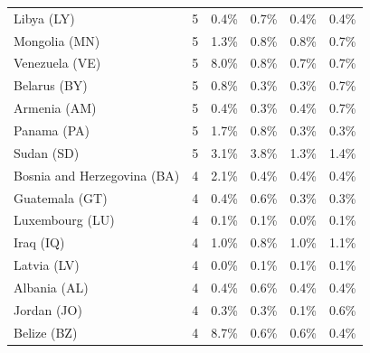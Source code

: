 {\begin{table}[ht]
{\begin{tabular}{lccccc}
Libya (LY)            &     5  & \cellcolor{green0} 0.4\% & 0.7\% & \cellcolor{green0} 0.4\% & \cellcolor{green0} 0.4\% \\  %
Mongolia (MN)         &     5  & \cellcolor{red0} 1.3\% & 0.8\% & 0.8\% & \cellcolor{green0} 0.7\% \\  %
Venezuela (VE)        &     5  & \cellcolor{red5}  8.0\% & \cellcolor{green0} 0.8\% & \cellcolor{green0} 0.7\% & \cellcolor{green0} 0.7\% \\  %
Belarus (BY)          &     5  & 0.8\% & \cellcolor{green1} 0.3\% & \cellcolor{green1} 0.3\% & 0.7\% \\  %
Armenia (AM)          &     5  & \cellcolor{green1} 0.4\% & \cellcolor{green2} 0.3\% & \cellcolor{green1} 0.4\% & 0.7\% \\  %
Panama (PA)           &     5  & 1.7\% & \cellcolor{green0} 0.8\% & \cellcolor{green0} 0.3\% & \cellcolor{green0} 0.3\% \\  %
Sudan (SD)            &     5  & 3.1\% & 3.8\% & \cellcolor{green1} 1.3\% & \cellcolor{green1} 1.4\% \\  %
Bosnia and Herzegovina (BA)  &     4  & \cellcolor{red1} 2.1\% & \cellcolor{green0} 0.4\% & \cellcolor{green0} 0.4\% & \cellcolor{green0} 0.4\% \\  %
Guatemala (GT)        &     4  & 0.4\% & \cellcolor{red0} 0.6\% & \cellcolor{green1} 0.3\% & \cellcolor{green1} 0.3\% \\  %
Luxembourg (LU)       &     4  & 0.1\% & 0.1\% & \cellcolor{green0} 0.0\% & 0.1\% \\  %
Iraq (IQ)             &     4  & \cellcolor{green0} 1.0\% & \cellcolor{green0} 0.8\% & \cellcolor{green0} 1.0\% & \cellcolor{green0} 1.1\% \\  %
Latvia (LV)           &     4  & \cellcolor{green2} 0.0\% & 0.1\% & 0.1\% & 0.1\% \\  %
Albania (AL)          &     4  & \cellcolor{green0} 0.4\% & 0.6\% & \cellcolor{green0} 0.4\% & \cellcolor{green0} 0.4\% \\  %
Jordan (JO)           &     4  & 0.3\% & 0.3\% & \cellcolor{green1} 0.1\% & \cellcolor{red2} 0.6\% \\  %
Belize (BZ)           &     4  & \cellcolor{red5}  8.7\% & \cellcolor{green0} 0.6\% & \cellcolor{green0} 0.6\% & \cellcolor{green0} 0.4\% \\  %

\end{tabular}}
\end{table}}
